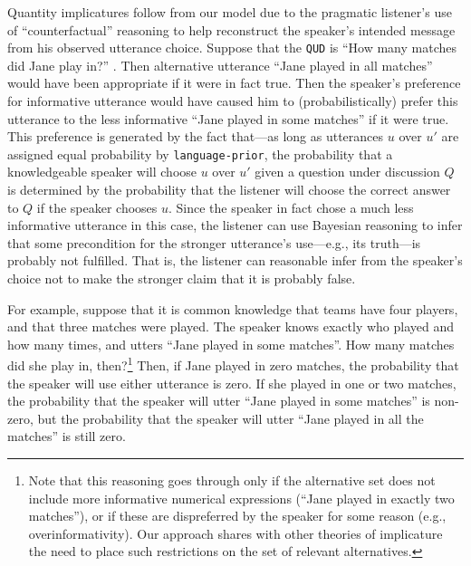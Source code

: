 \documentclass[pdfextras]{handbook}
\begin{document}
Quantity implicatures follow from our model due to the pragmatic listener's use of ``counterfactual'' reasoning to help reconstruct the speaker's intended message from his observed utterance choice.
Suppose that the \lstinline{QUD} is ``How many matches did Jane play in?''
. 
Then alternative utterance ``Jane played in all matches'' would have been appropriate if it were in fact true. Then the speaker's preference for informative utterance would have caused him to (probabilistically) prefer this utterance to the less informative ``Jane played in some matches'' if it were true. 
This preference is generated by the fact that---as long as utterances $u$ over $u'$ are assigned equal probability by \lstinline{language-prior}, the probability that a knowledgeable speaker will choose $u$ over $u'$ given a question under discussion $Q$ is determined by the probability that the listener will choose the correct answer to $Q$ if the speaker chooses $u$.
Since the speaker in fact chose a much less informative utterance in this case, the listener can use Bayesian reasoning to infer that some precondition for the stronger utterance's use---e.g., its truth---is probably not fulfilled. 
That is, the listener can reasonable infer from the speaker's choice not to make the stronger claim that it is probably false.

For example, suppose that it is common knowledge that teams have four players, and that three matches were played. The speaker knows exactly who played and how many times, and utters ``Jane played in some matches''. How many matches did she play in, then?\footnote{Note that this reasoning goes through only if the alternative set does not include more informative numerical expressions (``Jane played in exactly two matches''), or if these are dispreferred by the speaker for some reason (e.g., overinformativity). Our approach shares with other theories of implicature the need to place such restrictions on the set of relevant alternatives.} Then, if Jane played in zero matches, the probability that the speaker will use either utterance is zero. If she played in one or two matches, the probability that the speaker will utter ``Jane played in some matches'' is non-zero, but the probability that the speaker will utter ``Jane played in all the matches'' is still zero. 
\end{document}
